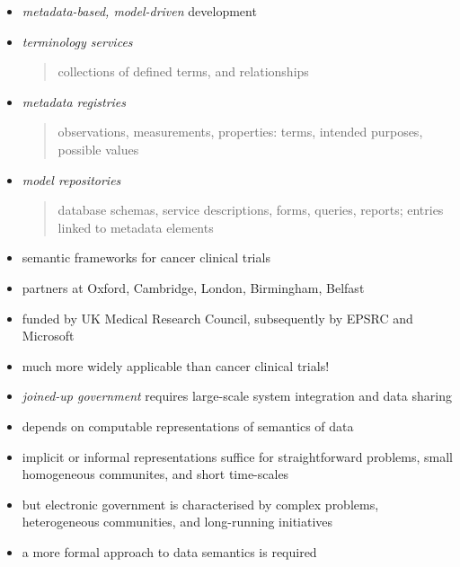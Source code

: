 \documentclass{sepslide-soa-faked} %
\begin{document}
\begin{slide}
\begin{itemize}
\item \emph{metadata-based, model-driven} development
\item \emph{terminology services}
\begin{quote}
collections of defined terms, and relationships
\end{quote}
\item \emph{metadata registries}
\begin{quote}
observations, measurements, properties:
terms, intended purposes, possible values
\end{quote}
\item \emph{model repositories}
\begin{quote}
database schemas, service descriptions, forms, queries, reports;
entries linked to metadata elements
\end{quote}
\end{itemize}
\end{slide}

\begin{slide}
\begin{itemize}
\item semantic frameworks for cancer clinical trials
\item partners at Oxford, Cambridge, London, Birmingham, Belfast
\item funded by UK Medical Research Council,
  subsequently by EPSRC and Microsoft 
\item much more widely applicable than cancer clinical trials!
\end{itemize}
\end{slide}

\begin{slide}
\begin{itemize}
\item \emph{joined-up government} requires large-scale system integration and data sharing
\item depends on computable representations of semantics of data
\item implicit or informal representations suffice for straightforward problems, small homogeneous communites, and short time-scales
\item but electronic government is characterised by complex problems, heterogeneous communities, and long-running initiatives
\item a more formal approach to data semantics is required
\end{itemize}
\end{slide}

\begin{slide}
  \Listofslides
\end{slide}

\begin{slide}
  \Timetable
\end{slide}
\end{document}
